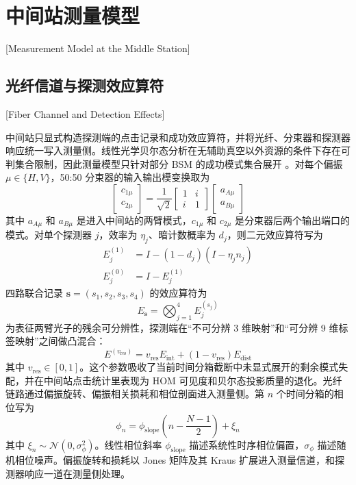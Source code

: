 \section{中间站测量模型}[Measurement Model at the Middle Station]

\subsection{光纤信道与探测效应算符}[Fiber Channel and Detection Effects]

中间站只显式构造探测端的点击记录和成功效应算符，并将光纤、分束器和探测器响应统一写入测量侧。线性光学贝尔态分析在无辅助真空以外资源的条件下存在可判集合限制，因此测量模型只针对部分 BSM 的成功模式集合展开 \cite{CalsamigliaLutkenhaus2001BellAnalyzer}。对每个偏振 $\mu\in\{H,V\}$，50:50 分束器的输入输出模变换取为
\begin{equation}
\begin{bmatrix}
c_{1\mu}\\
c_{2\mu}
\end{bmatrix}
=
\frac{1}{\sqrt{2}}
\begin{bmatrix}
1&i\\
i&1
\end{bmatrix}
\begin{bmatrix}
a_{A\mu}\\
a_{B\mu}
\end{bmatrix}
\label{eq:bs-mode-map}
\end{equation}
其中 $a_{A\mu}$ 和 $a_{B\mu}$ 是进入中间站的两臂模式，$c_{1\mu}$ 和 $c_{2\mu}$ 是分束器后两个输出端口的模式。对单个探测器 $j$，效率为 $\eta_j$、暗计数概率为 $d_j$，则二元效应算符写为
\begin{align}
E_j^{(1)} &= I-(1-d_j)\left(I-\eta_j n_j\right)\\
E_j^{(0)} &= I-E_j^{(1)}
\label{eq:single-detector-effect}
\end{align}
四路联合记录 $\mathbf{s}=(s_1,s_2,s_3,s_4)$ 的效应算符为
\begin{equation}
E_{\mathbf{s}}=\bigotimes_{j=1}^{4}E_j^{(s_j)}
\label{eq:joint-detection-effect}
\end{equation}
为表征两臂光子的残余可分辨性，探测端在“不可分辨 3 维映射”和“可分辨 9 维标签映射”之间做凸混合：
\begin{equation}
E^{(v_{\mathrm{res}})}=
v_{\mathrm{res}}E_{\mathrm{int}}+(1-v_{\mathrm{res}})E_{\mathrm{dist}}
\label{eq:vres-mixture}
\end{equation}
其中 $v_{\mathrm{res}}\in[0,1]$。这个参数吸收了当前时间分箱截断中未显式展开的剩余模式失配，并在中间站点击统计里表现为 HOM 可见度和贝尔态投影质量的退化。光纤链路通过偏振旋转、偏振相关损耗和相位剖面进入测量侧。第 $n$ 个时间分箱的相位写为
\begin{equation}
\phi_n=\phi_{\mathrm{slope}}\!\left(n-\frac{N-1}{2}\right)+\xi_n
\label{eq:phase-profile-bin}
\end{equation}
其中 $\xi_n\sim\mathcal{N}(0,\sigma_\phi^2)$。线性相位斜率 $\phi_{\mathrm{slope}}$ 描述系统性时序相位偏置，$\sigma_\phi$ 描述随机相位噪声。偏振旋转和损耗以 Jones 矩阵及其 Kraus 扩展进入测量信道，和探测器响应一道在测量侧处理。

